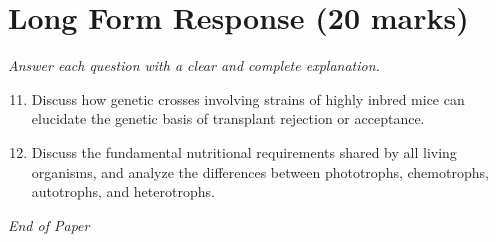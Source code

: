 \documentclass[12pt]{article}
\begin{document}
\section*{Long Form Response (20 marks)}
\textit{Answer each question with a clear and complete explanation.}
\begin{enumerate}[label=\arabic*.]
\setcounter{enumi}{10}
\item Discuss how genetic crosses involving strains of highly inbred mice can elucidate the genetic basis of transplant rejection or acceptance.
\item Discuss the fundamental nutritional requirements shared by all living organisms, and analyze the differences between phototrophs, chemotrophs, autotrophs, and heterotrophs.
\end{enumerate}

\vfill
\noindent\textit{End of Paper}
\end{document}
